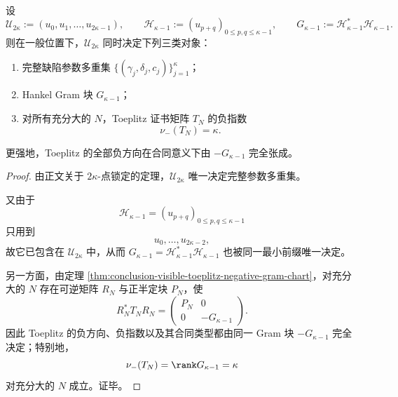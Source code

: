 \begin{theorem}[最小识别前缀同时是负方向的完整状态向量]\label{thm:conclusion-comoving-minimal-prefix-complete-negative-state}
设
\[
\mathcal U_{2\kappa}:=(u_0,u_1,\dots,u_{2\kappa-1}),
\qquad
\mathcal H_{\kappa-1}:=(u_{p+q})_{0\le p,q\le \kappa-1},
\qquad
G_{\kappa-1}:=\mathcal H_{\kappa-1}^*\mathcal H_{\kappa-1}.
\]
则在一般位置下，\(\mathcal U_{2\kappa}\) 同时决定下列三类对象：
\begin{enumerate}
  \item 完整缺陷参数多重集 \(\{(\gamma_j,\delta_j,c_j)\}_{j=1}^{\kappa}\)；
  \item Hankel Gram 块 \(G_{\kappa-1}\)；
  \item 对所有充分大的 \(N\)，Toeplitz 证书矩阵 \(T_N\) 的负指数
  \[
  \nu_-(T_N)=\kappa.
  \]
\end{enumerate}
更强地，Toeplitz 的全部负方向在合同意义下由 \(-G_{\kappa-1}\) 完全张成。
\end{theorem}
\begin{proof}
由正文关于 \(2\kappa\)-点锁定的定理，\(\mathcal U_{2\kappa}\) 唯一决定完整参数多重集。

又由于
\[
\mathcal H_{\kappa-1}=(u_{p+q})_{0\le p,q\le \kappa-1}
\]
只用到
\[
u_0,\dots,u_{2\kappa-2},
\]
故它已包含在 \(\mathcal U_{2\kappa}\) 中，从而 \(G_{\kappa-1}=\mathcal H_{\kappa-1}^*\mathcal H_{\kappa-1}\) 也被同一最小前缀唯一决定。

另一方面，由定理 \ref{thm:conclusion-visible-toeplitz-negative-gram-chart}，对充分大的 \(N\) 存在可逆矩阵 \(R_N\) 与正半定块 \(P_N\)，使
\[
R_N^*T_NR_N=
\begin{pmatrix}
P_N&0\\
0&-G_{\kappa-1}
\end{pmatrix}.
\]
因此 Toeplitz 的负方向、负指数以及其合同类型都由同一 Gram 块 \(-G_{\kappa-1}\) 完全决定；特别地，
\[
\nu_-(T_N)=\rank G_{\kappa-1}=\kappa
\]
对充分大的 \(N\) 成立。证毕。
\end{proof}

